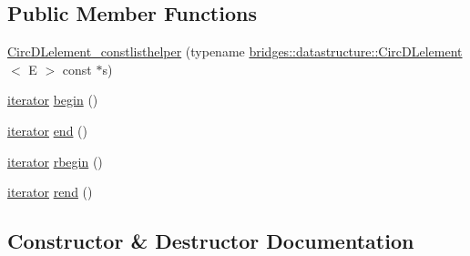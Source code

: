 \subsection*{Public Member Functions}
\begin{DoxyCompactItemize}
\item 
\hyperlink{classbridges_1_1datastructure_1_1_circ_d_lelement_1_1_circ_d_lelement__constlisthelper_acb75735d01573db3b99f81632aae490c}{Circ\+D\+Lelement\+\_\+constlisthelper} (typename \hyperlink{classbridges_1_1datastructure_1_1_circ_d_lelement}{bridges\+::datastructure\+::\+Circ\+D\+Lelement}$<$ E $>$ const $\ast$s)
\item 
\hyperlink{classbridges_1_1datastructure_1_1_circ_d_lelement_1_1_circ_d_lelement__constlisthelper_1_1iterator}{iterator} \hyperlink{classbridges_1_1datastructure_1_1_circ_d_lelement_1_1_circ_d_lelement__constlisthelper_a3c0505dae6b044cbb0c56c772eb33b3e}{begin} ()
\item 
\hyperlink{classbridges_1_1datastructure_1_1_circ_d_lelement_1_1_circ_d_lelement__constlisthelper_1_1iterator}{iterator} \hyperlink{classbridges_1_1datastructure_1_1_circ_d_lelement_1_1_circ_d_lelement__constlisthelper_ac6c3b1a138ae5c8ddb0b55d08c4ae19d}{end} ()
\item 
\hyperlink{classbridges_1_1datastructure_1_1_circ_d_lelement_1_1_circ_d_lelement__constlisthelper_1_1iterator}{iterator} \hyperlink{classbridges_1_1datastructure_1_1_circ_d_lelement_1_1_circ_d_lelement__constlisthelper_abf94a30d0eeddd99752fd2dfca86665d}{rbegin} ()
\item 
\hyperlink{classbridges_1_1datastructure_1_1_circ_d_lelement_1_1_circ_d_lelement__constlisthelper_1_1iterator}{iterator} \hyperlink{classbridges_1_1datastructure_1_1_circ_d_lelement_1_1_circ_d_lelement__constlisthelper_adcfb956dad9f130975df6632f97a3b82}{rend} ()
\end{DoxyCompactItemize}


\subsection{Constructor \& Destructor Documentation}
\mbox{\label{classbridges_1_1datastructure_1_1_circ_d_lelement_1_1_circ_d_lelement__constlisthelper_acb75735d01573db3b99f81632aae490c}} 
